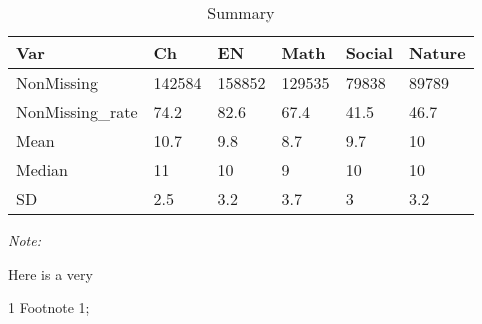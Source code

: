 \begin{table}
\centering
\caption{Summary}
\centering
\begin{threeparttable}
\begin{tabular}[t]{llllll}
\toprule
Var & Ch & EN & Math & Social & Nature\\
\midrule
NonMissing & 142584 & 158852 & 129535 & 79838 & 89789\\
NonMissing\_rate & 74.2 & 82.6 & 67.4 & 41.5 & 46.7\\
Mean & 10.7 & 9.8 & 8.7 & 9.7 & 10\\
Median & 11 & 10 & 9 & 10 & 10\\
SD & 2.5 & 3.2 & 3.7 & 3 & 3.2\\
\bottomrule
\end{tabular}
\begin{tablenotes}
\item \textit{Note: } 
\item Here is a very
\item[1] Footnote 1; 
\end{tablenotes}
\end{threeparttable}
\end{table}
